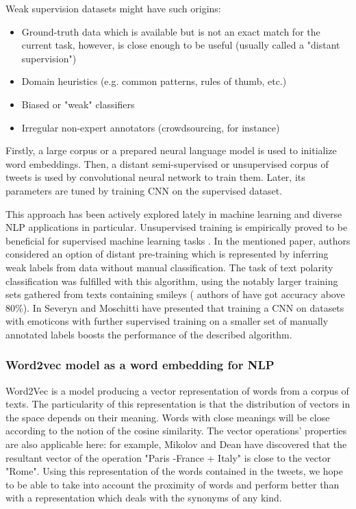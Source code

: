 \documentclass[12pt,a4paper]{article}
\begin{document}
Weak supervision datasets might have such origins:
\begin{itemize}
\item Ground-truth data which is available but is not an exact match for the current task, however, is close enough to be useful (usually called a "distant supervision")
\item Domain heuristics (e.g. common patterns, rules of thumb, etc.)
\item Biased or "weak" classifiers
\item Irregular non-expert annotators (crowdsourcing, for instance)
\end{itemize}

Firstly, a large corpus or a prepared neural language model is used to initialize word embeddings. Then, a distant semi-supervised or unsupervised corpus of tweets is used by convolutional neural network to train them. Later, its parameters are tuned by training CNN on the supervised dataset.\cite{sent2015} 

This approach has been actively explored lately in machine learning and diverse NLP applications in particular. \cite{SemEval2017} Unsupervised training is empirically proved to be beneficial for supervised machine learning tasks \cite{benj_pretr}. In the mentioned paper, authors considered an option of distant pre-training which is represented by inferring weak labels from data without manual classification. The task of text polarity classification was fulfilled with this algorithm, using the notably larger training sets gathered from texts containing smileys ( authors of \cite{techn_rep_stanf} have got accuracy above 80\%). In \cite{sent2015_UNITN} Severyn and Moschitti have presented that training a CNN on datasets with emoticons with further supervised training on a smaller set of manually annotated labels boosts the performance of the described algorithm.

\subsubsection{Word2vec model as a word embedding for NLP}
Word2Vec \cite{w2v_model} is a model producing a vector representation of words from a corpus of texts. The particularity of this representation is that the distribution of vectors in the space depends on their meaning. Words with close meanings will be close according to the notion of the cosine similarity. The vector operations' properties are also applicable here: for example, Mikolov and Dean \cite{mikolov_dean} have discovered that the resultant vector of the operation "Paris -France + Italy" is close to the vector "Rome". Using this representation of the words contained in the tweets, we hope to be able to take into account the proximity of words and perform better than with a representation which deals with the synonyms of any kind.
\end{document}
